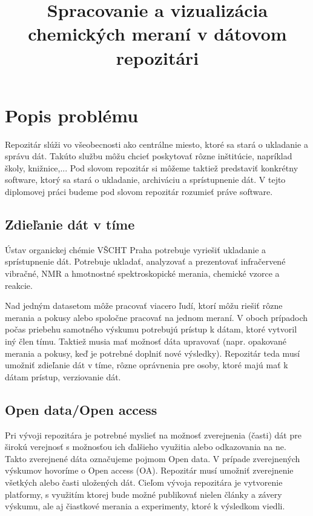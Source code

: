\documentclass[thesis=M,slovak]{FITthesis}[2013/05/06]
\title{Spracovanie a vizualizácia chemických meraní v dátovom repozitári}
\begin{document}

\begin{introduction}
\end{introduction}

\chapter{Popis problému}
Repozitár slúži vo všeobecnosti ako centrálne miesto, ktoré sa stará o ukladanie a správu dát. Takúto službu môžu chcieť poskytovať rôzne inštitúcie, napríklad školy, knižnice,... Pod slovom repozitár si môžeme taktiež predstaviť konkrétny software, ktorý sa stará o ukladanie, archiváciu a sprístupnenie dát. V tejto diplomovej práci budeme pod slovom repozitár rozumieť práve software.

\section{Zdieľanie dát v tíme}
Ústav organickej chémie VŠCHT Praha potrebuje vyriešiť ukladanie a sprístupnenie dát. Potrebuje ukladať, analyzovať a prezentovať infračervené vibračné, NMR a hmotnostné spektroskopické merania, chemické vzorce a reakcie.

Nad jedným datasetom môže pracovať viacero ľudí, ktorí môžu riešiť rôzne merania a pokusy alebo spoločne pracovať na jednom meraní. V oboch prípadoch počas priebehu samotného výskumu potrebujú prístup k dátam, ktoré vytvoril iný člen tímu. Taktiež musia mať možnosť dáta upravovať (napr. opakované merania a pokusy, keď je potrebné doplniť nové výsledky). Repozitár teda musí umožniť zdieľanie dát v tíme, rôzne oprávnenia pre osoby, ktoré majú mať k dátam prístup, verziovanie dát.

\section{Open data/Open access}
Pri vývoji repozitára je potrebné myslieť na možnosť zverejnenia (časti) dát pre širokú verejnosť s možnosťou ich ďalšieho využitia alebo odkazovania na ne. Takto zverejnené dáta označujeme pojmom Open data. V prípade zverejnených výskumov hovoríme o Open access (OA). Repozitár musí umožniť zverejnenie všetkých alebo časti uložených dát. Cieľom vývoja repozitára je vytvorenie platformy, s využitím ktorej bude možné publikovať nielen články a závery výskumu, ale aj čiastkové merania a experimenty, ktoré k výsledkom viedli.
\end{document}
